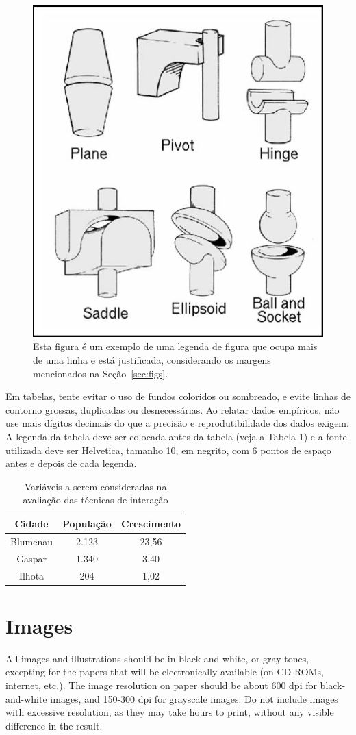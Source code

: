 \documentclass[12pt]{article}
\begin{document}
\begin{figure}[ht]
\centering
\includegraphics[width=.3\textwidth]{fig2.jpg}
\caption{Esta figura é um exemplo de uma legenda de figura que ocupa mais de uma linha e 
está justificada, considerando os margens mencionados na Seção~\ref{sec:figs}.}
\label{fig:exampleFig2}
\end{figure}

Em tabelas, tente evitar o uso de fundos coloridos ou sombreado, e evite linhas de contorno grossas, duplicadas ou desnecessárias. Ao relatar dados empíricos, não use mais dígitos decimais do que a precisão e reprodutibilidade dos dados exigem. A legenda da tabela deve ser colocada antes da tabela (veja a Tabela 1) e a fonte utilizada deve ser Helvetica, tamanho 10, em negrito, com 6 pontos de espaço antes e depois de cada legenda.

\begin{table}[ht]
  \centering
  \caption{Variáveis a serem consideradas na avaliação das técnicas de interação}
  \label{tab:exTable1}
  \begin{tabular}{|c|c|c|}
    \hline
    \textbf{Cidade} & \textbf{População} & \textbf{Crescimento} \\
    \hline
    Blumenau & 2.123 & 23,56 \\
    Gaspar & 1.340 & 3,40 \\
    Ilhota & 204 & 1,02 \\
    \hline
  \end{tabular}
\end{table}
    
\section{Images}

All images and illustrations should be in black-and-white, or gray tones,
excepting for the papers that will be electronically available (on CD-ROMs,
internet, etc.). The image resolution on paper should be about 600 dpi for
black-and-white images, and 150-300 dpi for grayscale images.  Do not include
images with excessive resolution, as they may take hours to print, without any
visible difference in the result. 
\end{document}
